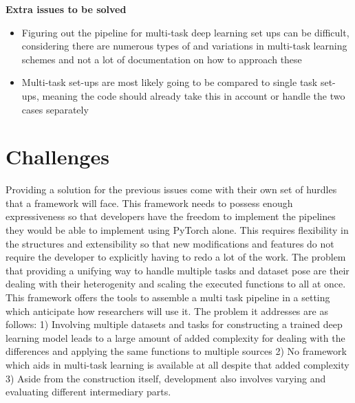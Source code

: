 \textbf{Extra issues to be solved}
\begin{itemize}
	\item Figuring out the pipeline for multi-task deep learning set ups can be difficult, considering there are numerous types of and variations in multi-task learning schemes and not a lot of documentation on how to approach these
	\item Multi-task set-ups are most likely going to be compared to single task set-ups, meaning the code should already take this in account or handle the two cases separately
\end{itemize}

\section{Challenges}

Providing a solution for the previous issues come with their own set of hurdles that a framework will face. This framework needs to possess enough expressiveness so that developers have the freedom to implement the pipelines they would be able to implement using PyTorch alone. This requires flexibility in the structures and extensibility so that new modifications and features do not require the developer to explicitly having to redo a lot of the work. The problem that providing a unifying way to handle multiple tasks and dataset pose are their dealing with their heterogenity and scaling the executed functions to all at once.\\

This framework offers the tools to assemble a multi task pipeline in a setting which anticipate how researchers will use it. The problem it addresses are as follows: 1) Involving multiple datasets and tasks for constructing a trained deep learning model leads to a large amount of added complexity for dealing with the differences and applying the same functions to multiple sources 2) No framework which aids in multi-task learning is available at all despite that added complexity 3) Aside from the construction itself, development also involves varying and evaluating different intermediary parts. 

